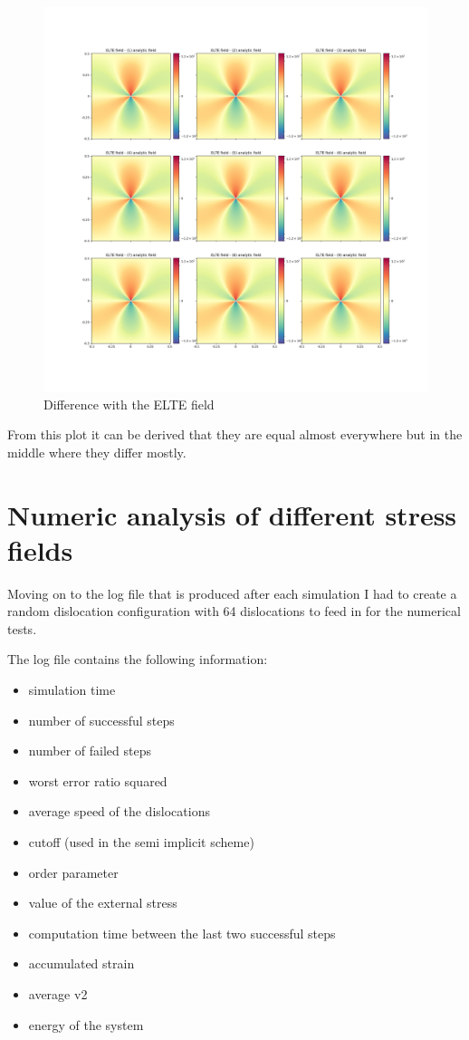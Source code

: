 \documentclass[12pt,a4paper]{article}
\theoremstyle{plain}
\begin{document}
\begin{multicols*}{2}
	\begin{figure}[H]
		\centering
		\includegraphics[width=.8\columnwidth]{./difference_of_analytic_field_and_elte_field.png}
		\caption{Difference with the ELTE field}
		\label{fig:elte}
	\end{figure}

	\par From this plot it can be derived that they are equal almost everywhere but in the middle where
	they differ mostly.

	\section{Numeric analysis of different stress fields}

	\par Moving on to the log file that is produced after each simulation I had to create
	a random dislocation configuration with 64 dislocations to feed in for the numerical tests.

	\par The log file contains the following information:

	\begin{itemize}
		\item simulation time
		\item number of successful steps
		\item number of failed steps
		\item worst error ratio squared
		\item average speed of the dislocations
		\item cutoff (used in the semi implicit scheme)
		\item order parameter
		\item value of the external stress
		\item computation time between the last two successful steps
		\item accumulated strain
		\item average v2
		\item energy of the system
	\end{itemize}


\end{multicols*}
\end{document}
